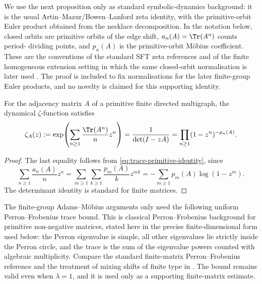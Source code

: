 We use the next proposition only as standard symbolic-dynamics
background: it is the usual Artin--Mazur/Bowen--Lanford zeta identity,
with the primitive-orbit Euler product obtained from the necklace
decomposition.  In the notation below, closed orbits are primitive orbits
of the edge shift, \(a_n(A)=\Tr(A^n)\) counts period-
dividing points, and \(p_n(A)\) is the primitive-orbit M\"obius
coefficient.  These are the conventions of the standard SFT zeta
references
\cite{ArtinMazur1965PeriodicPoints,BowenLanford1970Zeta,LindMarcus1995,ParryPollicott1990Zeta}
and of the finite homogeneous extension setting in which the same
closed-orbit normalisation is later used
\cite{NooraniParry1992ChebotarevShifts}.  The proof is included to fix
normalisations for the later finite-group Euler products, and no novelty is
claimed for this supporting identity.

\begin{proposition}
  \label{prop:prelim-trace-primitive}
  For the adjacency matrix \(A\) of a primitive finite directed
  multigraph, the dynamical \(\zeta\)-function
  satisfies
  \begin{equation}\label{eq:zeta-def}
    \zeta_A(z)
    :=\exp\!\left(\sum_{n\ge 1}\frac{\Tr(A^n)}{n}z^n\right)
    =\frac{1}{\det(I-zA)}
    =\prod_{n\ge 1}(1-z^n)^{-p_n(A)}.
  \end{equation}
\end{proposition}

\begin{proof}
  The last equality follows from \eqref{eq:trace-primitive-identity},
  since
  \[
    \sum_{n\ge 1}\frac{a_n(A)}{n}z^n
    =\sum_{m\ge 1}\sum_{k\ge 1}\frac{p_m(A)}{k}z^{mk}
    =-\sum_{m\ge 1}p_m(A)\log(1-z^m).
  \]
  The determinant identity is standard for finite matrices.
\end{proof}

The finite-group Adams--M\"obius arguments only need the following
uniform Perron--Frobenius trace bound.  This is classical
Perron--Frobenius background for primitive non-negative matrices, stated
here in the precise finite-dimensional form used below: the Perron
eigenvalue is simple, all other eigenvalues lie strictly inside the Perron
circle, and the trace is the sum of the eigenvalue powers counted with
algebraic multiplicity.  Compare the standard finite-matrix
Perron--Frobenius reference \cite{Seneta2006NonnegativeMatrices} and the
treatment of mixing shifts of finite type in
\cite{LindMarcus1995,ParryPollicott1990Zeta}.
The bound remains valid even when \(\lambda=1\), and it is used only as a
supporting finite-matrix estimate.

